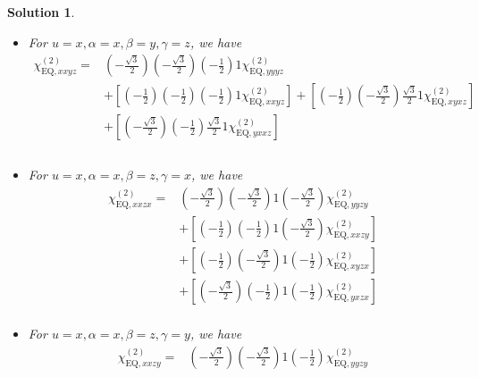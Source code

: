 \documentclass[UTF8,10pt,a4paper]{article}
\theoremstyle{Problem}
\theoremstyle{Solution}
\newtheorem*{sol}{Solution}
\begin{document}
\begin{sol}
\begin{itemize}
\begin{align}
\nonumber&+\left[\left(-\frac{\sqrt{3}}{2}\right)\left(-\frac{1}{2}\right)\left(-\frac{1}{2}\right)\frac{\sqrt{3}}{2}\chi_{\text{EQ},yxyx}^{(2)}\right]+\left[\left(-\frac{\sqrt{3}}{2}\right)\left(-\frac{\sqrt{3}}{2}\right)\frac{\sqrt{3}}{2}\frac{\sqrt{3}}{2}\chi_{\text{EQ},yyxx}^{(2)}\right]\\
&+\left[\left(-\frac{1}{2}\right)\left(-\frac{1}{2}\right)\frac{\sqrt{3}}{2}\frac{\sqrt{3}}{2}\chi_{\text{EQ},xxxx}^{(2)}\right]
\end{align}\normalsize
\item For $u=x,\alpha=x,\beta=y,\gamma=z$, we have
\footnotesize\begin{align}
\nonumber\chi_{\text{EQ},xxyz}^{(2)}=&\left(-\frac{\sqrt{3}}{2}\right)\left(-\frac{\sqrt{3}}{2}\right)\left(-\frac{1}{2}\right)1\chi_{\text{EQ},yyyz}^{(2)}\\
\nonumber&+\left[\left(-\frac{1}{2}\right)\left(-\frac{1}{2}\right)\left(-\frac{1}{2}\right)1\chi_{\text{EQ},xxyz}^{(2)}\right]+\left[\left(-\frac{1}{2}\right)\left(-\frac{\sqrt{3}}{2}\right)\frac{\sqrt{3}}{2}1\chi_{\text{EQ},xyxz}^{(2)}\right]\\
\nonumber&+\left[\left(-\frac{\sqrt{3}}{2}\right)\left(-\frac{1}{2}\right)\frac{\sqrt{3}}{2}1\chi_{\text{EQ},yxxz}^{(2)}\right]\\
\nonumber&\\
&
\end{align}\normalsize
\item For $u=x,\alpha=x,\beta=z,\gamma=x$, we have
\footnotesize\begin{align}
\nonumber\chi_{\text{EQ},xxzx}^{(2)}=&\left(-\frac{\sqrt{3}}{2}\right)\left(-\frac{\sqrt{3}}{2}\right)1\left(-\frac{\sqrt{3}}{2}\right)\chi_{\text{EQ},yyzy}^{(2)}\\
\nonumber&+\left[\left(-\frac{1}{2}\right)\left(-\frac{1}{2}\right)1\left(-\frac{\sqrt{3}}{2}\right)\chi_{\text{EQ},xxzy}^{(2)}\right]\\
\nonumber&+\left[\left(-\frac{1}{2}\right)\left(-\frac{\sqrt{3}}{2}\right)1\left(-\frac{1}{2}\right)\chi_{\text{EQ},xyzx}^{(2)}\right]\\
\nonumber&+\left[\left(-\frac{\sqrt{3}}{2}\right)\left(-\frac{1}{2}\right)1\left(-\frac{1}{2}\right)\chi_{\text{EQ},yxzx}^{(2)}\right]\\
&
\end{align}\normalsize
\item For $u=x,\alpha=x,\beta=z,\gamma=y$, we have
\footnotesize\begin{align}
\nonumber\chi_{\text{EQ},xxzy}^{(2)}=&\left(-\frac{\sqrt{3}}{2}\right)\left(-\frac{\sqrt{3}}{2}\right)1\left(-\frac{1}{2}\right)\chi_{\text{EQ},yyzy}^{(2)}\\

\end{align}
\end{itemize}
\end{sol}
\end{document}

